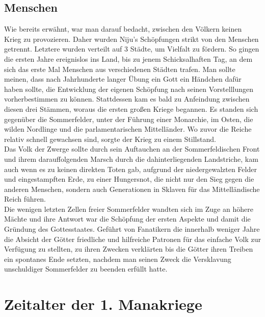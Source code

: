 \documentclass[a4paper,12pt,oneside]{book}
\begin{document}
\section{Menschen}
Wie bereits erwähnt, war man darauf bedacht, zwischen den Völkern keinen Krieg zu provozieren. Daher wurden Niju's Schöpfungen strikt von den Menschen getrennt. Letztere wurden verteilt auf 3 Städte, um Vielfalt zu fördern. So gingen die ersten Jahre ereignislos ins Land, bis zu jenem Schicksalhaften Tag, an dem sich das erste Mal Menschen aus verschiedenen Städten trafen. Man sollte meinen, dass nach Jahrhunderte langer Übung ein Gott ein Händchen dafür haben sollte, die Entwicklung der eigenen Schöpfung nach seinen Vorstelllungen vorherbestimmen zu können. Stattdessen kam es bald zu Anfeindung zwischen diesen drei Stämmen, woraus die ersten großen Kriege begannen. Es standen sich gegenüber die Sommerfelder, unter der Führung einer Monarchie, im Osten, die wilden Nordlinge und die parlamentarischen Mittelländer. Wo zuvor die Reiche relativ schnell gewachsen sind, sorgte der Krieg zu einem Stillstand.
\\Das Volk der Zwerge sollte durch sein Auftauchen an der Sommerfeldischen Front und ihrem darauffolgenden Marsch durch die dahinterliegenden Landstriche, kam auch wenn es zu keinen direkten Toten gab, aufgrund der niedergewalzten Felder und eingestampften Erde, zu einer Hungersnot, die nicht nur den Sieg gegen die anderen Menschen, sondern auch Generationen in Sklaven für das Mittelländische Reich führen.
\\Die wenigen letzten Zellen freier Sommerfelder wandten sich im Zuge an höhere Mächte und ihre Antwort war die Schöpfung der ersten Aspekte und damit die Gründung des Gottesstaates. Geführt von Fanatikern die innerhalb weniger Jahre die Absicht der Götter friedliche und hilfreiche Patronen für das einfache Volk zur Verfügung zu stellten, zu ihren Zwecken verklärten bis die Götter ihren Treiben ein spontanes Ende setzten, nachdem man seinen Zweck die Versklavung unschuldiger Sommerfelder zu beenden erfüllt hatte.
\chapter{Zeitalter der 1. Manakriege}
  
\end{document}
